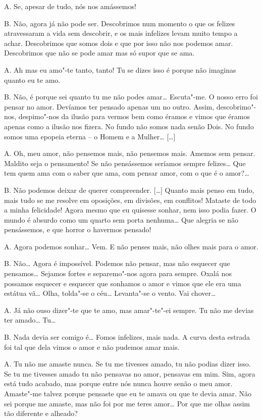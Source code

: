 \textsc{A.} Se, apesar de tudo, nós nos amássemos!

\textsc{B.} Não, agora já não pode ser. Descobrimos num momento o que os
felizes atravessaram a vida sem descobrir, e os mais infelizes levam
muito tempo a achar. Descobrimos que somos dois e que por isso não
nos podemos amar. Descobrimos que não se pode amar mas só supor que
se ama.

\textsc{A.} Ah mas eu amo"-te tanto, tanto! Tu se dizes isso é porque não
imaginas quanto eu te amo.

\textsc{B.} Não, é porque sei quanto tu me não podes amar\ldots{}
Escuta"-me. O nosso erro foi pensar no amor. Devíamos ter pensado
apenas um no outro. Assim, descobrimo"-nos, despimo"-nos da ilusão para
vermos bem como éramos e vimos que éramos apenas como a ilusão nos
fizera. No fundo não somos nada senão Dois. No fundo somos uma
epopeia eterna -- o Homem e a Mulher\ldots{} [\ldots{}]

\textsc{A.} Oh, meu amor, não pensemos mais, não pensemos mais. Amemos sem
pensar. Maldito seja o pensamento! Se não pensássemos seríamos sempre
felizes\ldots{} Que tem quem ama com o saber que ama, com pensar amor, com
o que é o amor?\ldots{}

\textsc{B.} Não podemos deixar de querer compreender. [\ldots{}] Quanto mais penso
em tudo, mais tudo se me resolve em oposições, em divisões, em
conflitos! Mataste de todo a minha felicidade! Agora mesmo que eu
quisesse sonhar, nem isso podia fazer. O mundo é absurdo como um
quarto sem porta nenhuma\ldots{} Que alegria se não pensássemos, e que
horror o havermos pensado!

\textsc{A.} Agora podemos sonhar\ldots{} Vem. E não penses mais, não olhes mais para
o amor.

\textsc{B.} Não\ldots{} Agora é impossível. Podemos não pensar, mas não esquecer que
pensamos\ldots{} Sejamos fortes e separemo"-nos agora para sempre. Oxalá
nos possamos esquecer e esquecer que sonhamos o amor e vimos que ele
era uma estátua vã\ldots{} Olha, tolda"-se o céu\ldots{} Levanta"-se o vento. Vai
chover\ldots{}

\textsc{A.} Já não ouso dizer"-te que te amo, mas amar"-te"-ei sempre. Tu não me
devias ter amado\ldots{} Tu\ldots{}

\textsc{B.} Nada devia ser comigo é\ldots{} Fomos infelizes, mais nada. A curva
desta estrada foi tal que dela vimos o amor e não pudemos amar mais.

\textsc{A.} Tu não me amaste nunca. Se tu me tivesses amado, tu não podias
dizer isso. Se tu me tivesses amado tu não pensavas no amor, pensavas
em mim. Sim, agora está tudo acabado, mas porque entre nós nunca
houve senão o meu amor. Amaste"-me talvez porque pensaste que eu te
amava ou que te devia amar. Não sei porque me amaste, mas não foi por
me teres amor\ldots{} Por que me olhas assim tão diferente e alheado?

